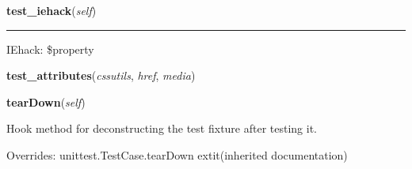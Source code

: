     \label{cssutils:tests:test_parse:CSSStyleSheetTestCase:test_iehack}

    \vspace{0.5ex}

\hspace{.8\funcindent}\begin{boxedminipage}{\funcwidth}

    \raggedright \textbf{test\_iehack}(\textit{self})

    \vspace{-1.5ex}

    \rule{\textwidth}{0.5\fboxrule}
\setlength{\parskip}{2ex}
    IEhack: \$property

\setlength{\parskip}{1ex}
    \end{boxedminipage}

    \label{cssutils:tests:test_parse:CSSStyleSheetTestCase:test_attributes}

    \vspace{0.5ex}

\hspace{.8\funcindent}\begin{boxedminipage}{\funcwidth}

    \raggedright \textbf{test\_attributes}(\textit{cssutils}, \textit{href}, \textit{media})

\setlength{\parskip}{2ex}
\setlength{\parskip}{1ex}
    \end{boxedminipage}

    \vspace{0.5ex}

\hspace{.8\funcindent}\begin{boxedminipage}{\funcwidth}

    \raggedright \textbf{tearDown}(\textit{self})

\setlength{\parskip}{2ex}
    Hook method for deconstructing the test fixture after testing it.

\setlength{\parskip}{1ex}
      Overrides: unittest.TestCase.tearDown 	extit{(inherited documentation)}

    \end{boxedminipage}


